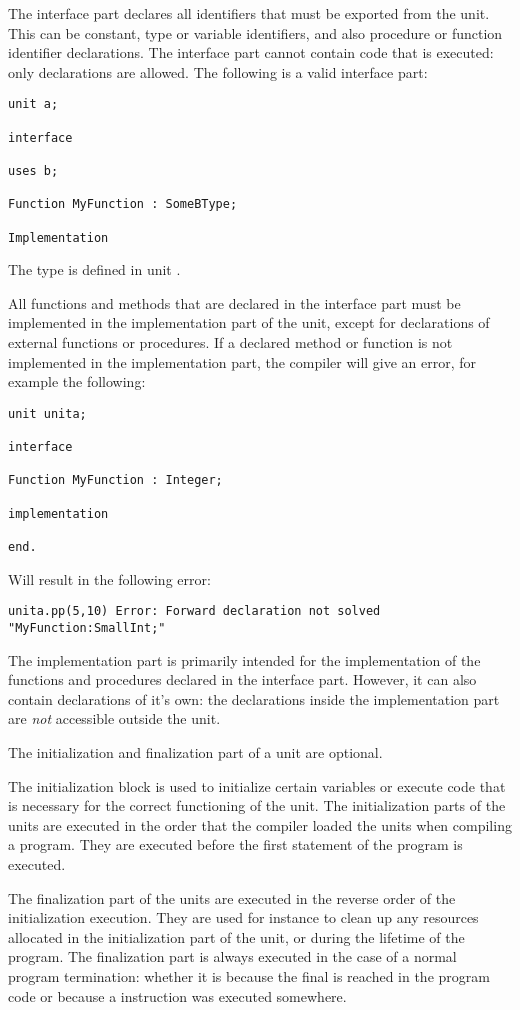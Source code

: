The interface part declares all identifiers that must be exported from the
unit. This can be constant, type or variable identifiers, and also procedure
or function identifier declarations.  The interface part cannot contain code
that is executed: only declarations are allowed. The following is a valid
interface part:
\begin{verbatim}
unit a;

interface

uses b;

Function MyFunction : SomeBType;

Implementation
\end{verbatim}
The type  is defined in unit .

All functions and methods that are declared in the interface part must
be implemented in the implementation part of the unit, except for
declarations of external functions or procedures. If a declared method 
or function is not implemented in the implementation part, the compiler
will give an error, for example the following:
\begin{verbatim}
unit unita;

interface

Function MyFunction : Integer;

implementation

end.
\end{verbatim}
Will result in the following error:
\begin{verbatim}
unita.pp(5,10) Error: Forward declaration not solved "MyFunction:SmallInt;"
\end{verbatim}

The implementation part is primarily intended for the implementation of the
functions and procedures declared in the interface part. However, it can
also contain declarations of it's own: the declarations inside the 
implementation part are {\em not} accessible outside the unit. 

The initialization and finalization part of a unit are optional.

The initialization block is used to initialize certain variables or 
execute code that is necessary for the correct functioning of the unit. 
The initialization parts of the units
are executed in the order that the compiler loaded the units when compiling 
a program. They are executed before the first statement of the program is
executed.

The finalization part of the units are executed in the reverse order of the
initialization execution. They are used for instance to clean up any resources 
allocated in the initialization part  of the unit, or during the lifetime of
the program. The finalization part is always executed in the case of a
normal program termination: whether it is because the final  is
reached in the program code or because a  instruction was executed
somewhere.

